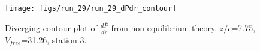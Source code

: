 \begin{figure}[H]
\centering
\texttt{[image: figs/run\_29/run\_29\_dPdr\_contour]}
\caption{Diverging contour plot of $\frac{d\bar{P}}{dr}$ from non-equilibrium theory. $z/c$=7.75, $V_{free}$=31.26, station 3.}
\label{fig:run_29_dPdr_contour}
\end{figure}


